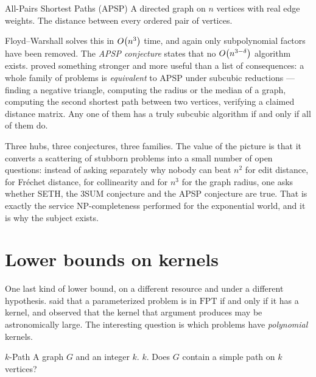 \begin{probdef}{All-Pairs Shortest Paths (APSP)}
  \instance A directed graph on $n$ vertices with real edge weights.
  \question The distance between every ordered pair of vertices.
\end{probdef}

Floyd--Warshall solves this in $O\!\left(n^3\right)$ time, and again only
subpolynomial factors have been removed. The \emph{APSP conjecture} states that
no $O\!\left(n^{3-\delta}\right)$ algorithm exists.
\citet{VassilevskaWilliamsWilliams2018} proved something stronger and more
useful than a list of consequences: a whole family of problems is
\emph{equivalent} to APSP under subcubic reductions --- finding a negative
triangle, computing the radius or the median of a graph, computing the second
shortest path between two vertices, verifying a claimed distance matrix. Any
one of them has a truly subcubic algorithm if and only if all of them do.

\begin{intuition}
Three hubs, three conjectures, three families. The value of the picture is that
it converts a scattering of stubborn problems into a small number of open
questions: instead of asking separately why nobody can beat $n^2$ for edit
distance, for Fr\'echet distance, for collinearity and for $n^3$ for the graph
radius, one asks whether SETH, the 3SUM conjecture and the APSP conjecture are
true. That is exactly the service \textrm{NP}-completeness performed for the
exponential world, and it is why the subject exists.
\end{intuition}

\section{Lower bounds on kernels}
\label{sec:kernel-lower-bounds}

One last kind of lower bound, on a different resource and under a different
hypothesis.  said that a parameterized problem is in
$\mathrm{FPT}$ if and only if it has a kernel, and observed that the kernel
that argument produces may be astronomically large. The interesting question
is which problems have \emph{polynomial} kernels.

\begin{probdef}{$k$-Path}
  \instance A graph $G$ and an integer $k$.
  \parameter $k$.
  \question Does $G$ contain a simple path on $k$ vertices?
\end{probdef}

